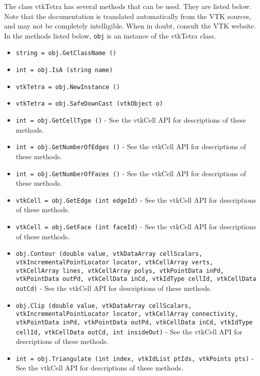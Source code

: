 The class vtkTetra has several methods that can be used.
  They are listed below.
Note that the documentation is translated automatically from the VTK sources,
and may not be completely intelligible.  When in doubt, consult the VTK website.
In the methods listed below, \verb|obj| is an instance of the vtkTetra class.
\begin{itemize}
\item  \verb|string = obj.GetClassName ()|

\item  \verb|int = obj.IsA (string name)|

\item  \verb|vtkTetra = obj.NewInstance ()|

\item  \verb|vtkTetra = obj.SafeDownCast (vtkObject o)|

\item  \verb|int = obj.GetCellType ()| -  See the vtkCell API for descriptions of these methods.

\item  \verb|int = obj.GetNumberOfEdges ()| -  See the vtkCell API for descriptions of these methods.

\item  \verb|int = obj.GetNumberOfFaces ()| -  See the vtkCell API for descriptions of these methods.

\item  \verb|vtkCell = obj.GetEdge (int edgeId)| -  See the vtkCell API for descriptions of these methods.

\item  \verb|vtkCell = obj.GetFace (int faceId)| -  See the vtkCell API for descriptions of these methods.

\item  \verb|obj.Contour (double value, vtkDataArray cellScalars, vtkIncrementalPointLocator locator, vtkCellArray verts, vtkCellArray lines, vtkCellArray polys, vtkPointData inPd, vtkPointData outPd, vtkCellData inCd, vtkIdType cellId, vtkCellData outCd)| -  See the vtkCell API for descriptions of these methods.

\item  \verb|obj.Clip (double value, vtkDataArray cellScalars, vtkIncrementalPointLocator locator, vtkCellArray connectivity, vtkPointData inPd, vtkPointData outPd, vtkCellData inCd, vtkIdType cellId, vtkCellData outCd, int insideOut)| -  See the vtkCell API for descriptions of these methods.

\item  \verb|int = obj.Triangulate (int index, vtkIdList ptIds, vtkPoints pts)| -  See the vtkCell API for descriptions of these methods.


\end{itemize}
